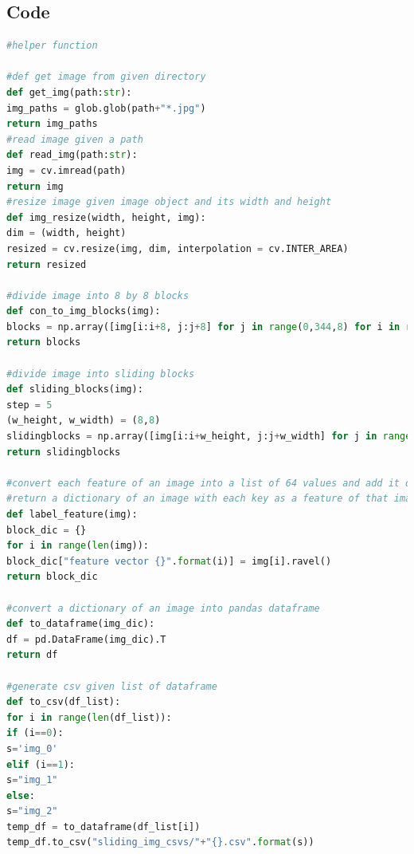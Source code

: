\documentclass{article}
\begin{document}
\subsection{Code}
\begin{lstlisting}[language=Python]
#helper function

#def get image from given directory
def get_img(path:str):
img_paths = glob.glob(path+"*.jpg")
return img_paths
#read image given a path
def read_img(path:str):
img = cv.imread(path)
return img
#resize image given image object and its width and height
def img_resize(width, height, img):
dim = (width, height)
resized = cv.resize(img, dim, interpolation = cv.INTER_AREA)
return resized

#divide image into 8 by 8 blocks
def con_to_img_blocks(img):
blocks = np.array([img[i:i+8, j:j+8] for j in range(0,344,8) for i in range(0,256,8)]) #iteratre over height and then width
return blocks

#divide image into sliding blocks
def sliding_blocks(img):
step = 5
(w_height, w_width) = (8,8)
slidingblocks = np.array([img[i:i+w_height, j:j+w_width] for j in range(0, img.shape[1]-w_width, step) for i in range(0,img.shape[0]-w_height, step)])
return slidingblocks

#convert each feature of an image into a list of 64 values and add it dictionary with key:feature# and value:list of values of length 64
#return a dictionary of an image with each key as a feature of that image
def label_feature(img):
block_dic = {}
for i in range(len(img)):
block_dic["feature vector {}".format(i)] = img[i].ravel()
return block_dic

#convert a dictionary of an image into pandas dataframe
def to_dataframe(img_dic):
df = pd.DataFrame(img_dic).T
return df

#generate csv given list of dataframe
def to_csv(df_list):
for i in range(len(df_list)):
if (i==0):
s='img_0'
elif (i==1):
s="img_1"
else:
s="img_2"
temp_df = to_dataframe(df_list[i])
temp_df.to_csv("sliding_img_csvs/"+"{}.csv".format(s))
\end{lstlisting}
\end{document}
